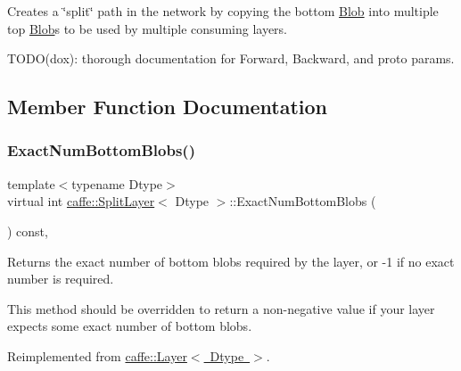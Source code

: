 Creates a \char`\"{}split\char`\"{} path in the network by copying the bottom \mbox{\hyperlink{classcaffe_1_1_blob}{Blob}} into multiple top \mbox{\hyperlink{classcaffe_1_1_blob}{Blob}}s to be used by multiple consuming layers. 

T\+O\+D\+O(dox)\+: thorough documentation for Forward, Backward, and proto params. 

\subsection{Member Function Documentation}
\mbox{\label{classcaffe_1_1_split_layer_a8ff310ac37e1e79ce6ef8fbc95be0cd9}} 
\subsubsection{\texorpdfstring{Exact\+Num\+Bottom\+Blobs()}{ExactNumBottomBlobs()}\hspace{0.1cm}{\footnotesize\ttfamily [1/2]}}
{\footnotesize\ttfamily template$<$typename Dtype$>$ \\
virtual int \mbox{\hyperlink{classcaffe_1_1_split_layer}{caffe\+::\+Split\+Layer}}$<$ Dtype $>$\+::Exact\+Num\+Bottom\+Blobs (\begin{DoxyParamCaption}{ }\end{DoxyParamCaption}) const\hspace{0.3cm}{\ttfamily [inline]}, {\ttfamily [virtual]}}



Returns the exact number of bottom blobs required by the layer, or -\/1 if no exact number is required. 

This method should be overridden to return a non-\/negative value if your layer expects some exact number of bottom blobs. 

Reimplemented from \mbox{\hyperlink{classcaffe_1_1_layer_a8e5ee0494d85f5f55fc4396537cbc60f}{caffe\+::\+Layer$<$ Dtype $>$}}.

\mbox{\label{classcaffe_1_1_split_layer_a8ff310ac37e1e79ce6ef8fbc95be0cd9}} 
